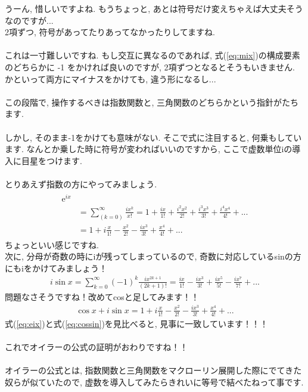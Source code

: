 \documentclass[11pt,a4paper,uplatex]{ujreport} 	%
\begin{document}
うーん, 惜しいですよね. もうちょっと, あとは符号だけ変えちゃえば大丈夫そうなのですが...\\
2項ずつ, 符号があってたりあってなかったりしてますね.\\
\\
これは一寸難しいですね. もし交互に異なるのであれば, 式(\ref{eq:mix})の構成要素のどちらかに -1 をかければ良いのですが, 2項ずつとなるとそうもいきません. かといって両方にマイナスをかけても, 違う形になるし...\\
\\
この段階で, 操作するべきは指数関数と, 三角関数のどちらかという指針がたちます.\\
\\
しかし, そのまま-1をかけても意味がない. そこで式に注目すると, 何乗もしています. なんとか乗した時に符号が変わればいいのですから, ここで虚数単位iの導入に目星をつけます.\\
\\
とりあえず指数の方にやってみましょう.
\begin{eqnarray}
\begin{split}
\mathrm{e}^{ix} \\
& = \sum_{(k=0)}^\infty \frac{ix^k}{x!} = 1 + \frac{ix}{1!} + \frac{i^2x^2}{2!} + \frac{i^3x^3}{3!} + \frac{i^4x^4}{4!} + ...\\
& = 1 + i\frac{x}{1!} - \frac{x^2}{2!} - \frac{ix^3}{3!} + \frac{x^4}{4!} + ...
\label{eq:eix}
\end{split}
\end{eqnarray}
ちょっといい感じですね.\\
次に, 分母が奇数の時にiが残ってしまっているので, 奇数に対応しているsinの方にもiをかけてみましょう！\\
\begin{eqnarray}
i\sin x = \sum_{k=0}^{\infty}(-1)^k \frac{ix^{2k + 1}}{(2k + 1)!} = \frac{ix}{1!} - \frac{ix^3}{3!} + \frac{ix^5}{5!} - \frac{ix^7}{7!} +  ...
\end{eqnarray}
問題なさそうですね！改めてcosと足してみます！！\\
\begin{eqnarray}
\cos x + i\sin x = 1 + i\frac{x}{1!} - \frac{x^2}{2!} - \frac{ix^3}{3!} + \frac{x^4}{4!} + ...
\label{eq:cossin}
\end{eqnarray}
式(\ref{eq:eix})と式(\ref{eq:cossin})を見比べると, 見事に一致しています！！！\\
\\
これでオイラーの公式の証明がおわりですね！！\\
\\
オイラーの公式とは, 指数関数と三角関数をマクローリン展開した際にでてきた奴らが似ていたので, 虚数を導入してみたらきれいに等号で結べたねって事です.\\
\end{document}
